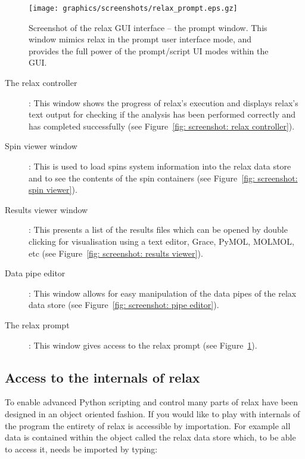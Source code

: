 \begin{figure}
\centerline{\texttt{[image: graphics/screenshots/relax\_prompt.eps.gz]}}
\caption[Prompt window screenshot]{Screenshot of the relax GUI interface -- the prompt window.  This window mimics relax in the prompt user interface mode, and provides the full power of the prompt/script UI modes within the GUI.}\label{fig: screenshot: prompt window}
\end{figure}


\begin{description}
\item[The relax controller]:  This window shows the progress of relax's execution and displays relax's text output for checking if the analysis has been performed correctly and has completed successfully (see Figure~\ref{fig: screenshot: relax controller}).
\item[Spin viewer window]:  This is used to load spins system information into the relax data store and to see the contents of the spin containers (see Figure~\ref{fig: screenshot: spin viewer}).
\item[Results viewer window]:  This presents a list of the results files which can be opened by double clicking for visualisation using a text editor, Grace, PyMOL, MOLMOL, etc (see Figure~\ref{fig: screenshot: results viewer}).
\item[Data pipe editor]:  This window allows for easy manipulation of the data pipes of the relax data store (see Figure~\ref{fig: screenshot: pipe editor}).
\item[The relax prompt]:  This window gives access to the relax prompt (see Figure~\ref{fig: screenshot: prompt window}).
\end{description}




\subsection{Access to the internals of relax}

To enable advanced Python scripting and control many parts of relax have been designed in an object oriented fashion.  If you would like to play with internals of the program the entirety of relax is accessible by importation.  For example all data is contained within the object called the relax data store which, to be able to access it, needs be imported by typing:

